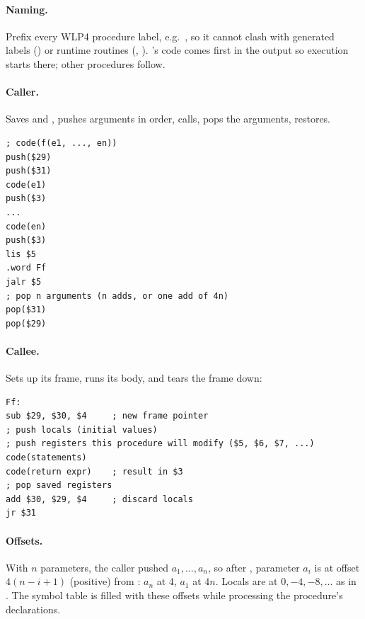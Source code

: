 \paragraph{Naming.} Prefix every WLP4 procedure label, e.g.\ , so it cannot
clash with generated labels () or runtime routines (, ).
's code comes first in the output so execution starts there; other procedures
follow.

\paragraph{Caller.} Saves  and , pushes arguments in order, calls,
pops the arguments, restores.
\begin{lstlisting}[style=mips]
; code(f(e1, ..., en))
push($29)
push($31)
code(e1)
push($3)
...
code(en)
push($3)
lis $5
.word Ff
jalr $5
; pop n arguments (n adds, or one add of 4n)
pop($31)
pop($29)
\end{lstlisting}

\paragraph{Callee.} Sets up its frame, runs its body, and tears the frame down:
\begin{lstlisting}[style=mips]
Ff:
sub $29, $30, $4     ; new frame pointer
; push locals (initial values)
; push registers this procedure will modify ($5, $6, $7, ...)
code(statements)
code(return expr)    ; result in $3
; pop saved registers
add $30, $29, $4     ; discard locals
jr $31
\end{lstlisting}

\paragraph{Offsets.} With $n$ parameters, the caller pushed $a_1,\dots,a_n$, so after
, parameter $a_i$ is at offset $4(n-i+1)$ (positive) from
: $a_n$ at $4$, $a_1$ at $4n$. Locals are at $0, -4, -8,\dots$ as in .
The symbol table is filled with these offsets while processing the procedure's declarations.

